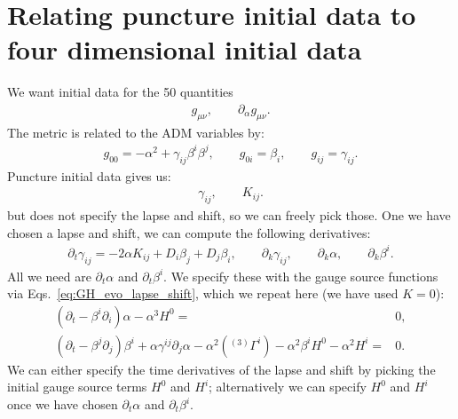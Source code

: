 \documentclass[%
notitlepage,
report,
nofootinbib,
 amsmath,amssymb,
 aps,
]{revtex4-1}
\begin{document}
\section{Relating puncture initial data to four dimensional initial data}
We want initial data for the 50 quantities
\begin{align}
   g_{\mu\nu},\qquad\partial_{\alpha}g_{\mu\nu}
   .
\end{align}
The metric is related to the ADM variables by:
\begin{subequations}
\begin{align}
   g_{00}
   =
   -  
   \alpha^2
   +
   \gamma_{ij}\beta^i\beta^j
   ,\qquad
   g_{0i}
   =
   \beta_i
   ,\qquad
   g_{ij}
   =
   \gamma_{ij}
   .
\end{align}
\end{subequations}
Puncture initial data gives us:
\begin{align}
   \gamma_{ij},\qquad K_{ij}
   .
\end{align}
but does not specify the lapse and shift, so we can freely pick those.
One we have chosen a lapse and shift, we can compute the following derivatives:
\begin{subequations}
\begin{align}
   \partial_t\gamma_{ij}
   =
   -
   2\alpha K_{ij}
   +
   D_i\beta_j
   +
   D_j\beta_i
   ,\qquad
   \partial_k\gamma_{ij}
   ,\qquad
   \partial_k\alpha
   ,\qquad
   \partial_k\beta^i
   .
\end{align}
\end{subequations}
All we need are $\partial_t\alpha$ and $\partial_t\beta^i$.
We specify these with the gauge source functions via
Eqs.~\eqref{eq:GH_evo_lapse_shift}, which we repeat here
(we have used $K=0$):
\begin{subequations}
\begin{align}
   \left(
      \partial_t
   -  \beta^i\partial_i
   \right)
   \alpha
   -  \alpha^3H^0
   =&
   0
   ,\\
   \left(
      \partial_t
   -  \beta^j\partial_j
   \right)
   \beta^i
+  \alpha\gamma^{ij}\partial_j\alpha
-  \alpha^2\left({}^{(3)}\Gamma^i\right)
-  \alpha^2\beta^iH^0
-  \alpha^2H^i
   =&
   0
   .
\end{align}   
\end{subequations}
We can either specify the time derivatives of the lapse and shift
by picking the initial gauge source terms $H^0$ and $H^i$;
alternatively we can specify $H^0$ and $H^i$ once we have chosen
$\partial_t\alpha$ and $\partial_t\beta^i$.
\end{document}
